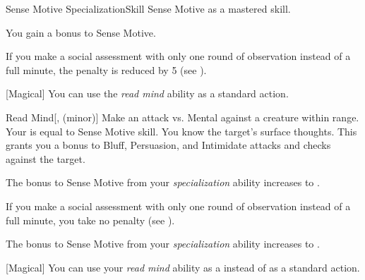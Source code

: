     \begin{feat}{Sense Motive Specialization}{Skill}
        \featpre Sense Motive as a mastered skill.

         You gain a  bonus to Sense Motive.

         If you make a social assessment with only one round of observation instead of a full minute, the penalty is reduced by 5 (see ).

        [Magical] You can use the \textit{read mind} ability as a standard action.
        \begin{apability}{Read Mind}[,  (minor)]
            Make an attack vs. Mental against a creature within \rngclose range.
            Your  is equal to Sense Motive skill.
            \hit You know the target's surface thoughts.
            This grants you a  bonus to Bluff, Persuasion, and Intimidate attacks and checks against the target.
        \end{apability}

         The bonus to Sense Motive from your \textit{specialization} ability increases to .

         If you make a social assessment with only one round of observation instead of a full minute, you take no penalty (see ).

         The bonus to Sense Motive from your \textit{specialization} ability increases to .

        [Magical] You can use your \textit{read mind} ability as a  instead of as a standard action.
    \end{feat}

